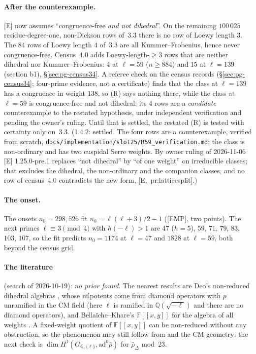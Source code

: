 \documentclass[11pt]{article}
\newcommand{\Q}{\mathbb{Q}}
\newcommand{\F}{\mathbb{F}}
\newcommand{\rhobar}{\bar\rho}
\newcommand{\pfile}[1]{\nolinkurl{#1}}
\newcommand{\EMP}{\textsf{\small[EMP]}}
\begin{document}
\paragraph{After the counterexample.} [E] now assumes ``congruence-free \emph{and not dihedral}''. On the remaining $100\,025$
residue-degree-one, non-Dickson rows of~3.3 there is no row of Loewy length $3$. The $84$ rows of Loewy length $4$ of~3.3 are all
Kummer--Frobenius, hence never congruence-free. Census~4.0 adds Loewy-length-$\ge3$ rows that are neither dihedral nor Kummer--Frobenius:
$4$ at $\ell=59$ ($n\ge884$) and $15$ at $\ell=139$ (section b1), \S\ref{sec:pg-census34}. A referee check on the census records (\S\ref{sec:pg-census34}; four-prime evidence, not a certificate) finds that
the class at $\ell=139$ has a congruence in weight $138$, so (R) says nothing there, while the class at $\ell=59$ is congruence-free and not
dihedral: its $4$ rows are a \emph{candidate} counterexample to the restated hypothesis, under independent verification and pending the owner's
ruling. Until that is settled, the restated (R) is tested with certainty only on~3.3. (1.4.2: settled. The four rows are a counterexample, verified
from scratch, \pfile{docs/implementation/slot25/R59_verification.md}; the class is non-ordinary and has two cuspidal Serre weights. By owner ruling of
2026-11-06 [E] 1.25.0-pre.1 replaces ``not dihedral'' by ``of one weight'' on irreducible classes; that excludes the dihedral, the non-ordinary and
the companion classes, and no row of census~4.0 contradicts the new form, [E,~pr:latticesplit].)

\paragraph{The onset.} The onsets $n_0=298,526$ fit $n_0=\ell(\ell+3)/2-1$ (\EMP, two points). The next primes $\ell\equiv3\pmod4$ with
$h(-\ell)>1$ are $47$ ($h=5$), $59$, $71$, $79$, $83$, $103$, $107$, so the fit predicts $n_0=1174$ at $\ell=47$ and $1828$ at $\ell=59$, both
beyond the census grid.

\paragraph{The literature} (search of 2026-10-19): \emph{no prior found}. The nearest results are Deo's non-reduced dihedral algebras
\cite[Prop.~27--28]{deo}, whose nilpotents come from diamond operators with $p$ unramified in the CM field (here $\ell$ is ramified in
$\Q(\sqrt{-\ell})$ and there are no diamond operators), and Bella\"iche--Khare's $\F[[x,y]]$ for the algebra of all weights \cite{bk}. A
fixed-weight quotient of $\F[[x,y]]$ can be non-reduced without any obstruction, so the phenomenon may still follow from \cite{bk,deo}
and the CM geometry; the next check is $\dim H^{1}(G_{\Q,\{\ell\}},\mathrm{ad}^{0}\rhobar)$ for $\rhobar_\Delta$ mod~$23$.
\end{document}
